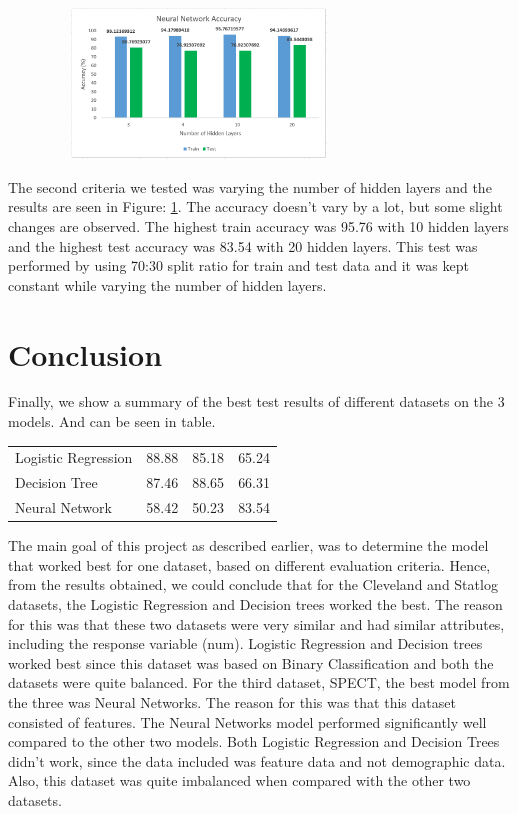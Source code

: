 \documentclass[conference]{IEEEtran}
\begin{document}
\begin{figure}[h!]
	\centering
	\includegraphics[height=4cm, width=8cm]{images/Fig19}
	\label{fig19}
\end{figure}

The second criteria we tested was varying the number of hidden layers and the results are seen in Figure: \ref{fig19}. The accuracy doesn’t vary by a lot, but some slight changes are observed. The highest train accuracy was 95.76 with 10 hidden layers and the highest test accuracy was 83.54 with 20 hidden layers. This test was performed by using 70:30 split ratio for train and test data and it was kept constant while varying the number of hidden layers. 

\section{Conclusion}
Finally, we show a summary of the best test results of different datasets on the 3 models. And can be seen in table. \\

\begin{tabular}{|l||*{3}{c|}}\hline
	\backslashbox{Methods}{Datasets}
	&\makebox[3em]{Cleveland}&\makebox[3em]{Statlog}&\makebox[3em]{Spect}
	\\\hline\hline
	Logistic Regression &88.88&85.18&65.24\\\hline
	Decision Tree &87.46&88.65&66.31\\\hline
	Neural Network &58.42&50.23&83.54\\\hline
\end{tabular}

\bigskip


The main goal of this project as described earlier, was to determine the model that worked best for one dataset, based on different evaluation criteria. Hence, from the results obtained, we could conclude that for the Cleveland and Statlog datasets, the Logistic Regression and Decision trees worked the best. The reason for this was that these two datasets were very similar and had similar attributes, including the response variable (num). Logistic Regression and Decision trees worked best since this dataset was based on Binary Classification and both the datasets were quite balanced. 
For the third dataset, SPECT, the best model from the three was Neural Networks. The reason for this was that this dataset consisted of features. The Neural Networks model performed significantly well compared to the other two models. Both Logistic Regression and Decision Trees didn’t work, since the data included was feature data and not demographic data. Also, this dataset was quite imbalanced when compared with the other two datasets.
\end{document}
